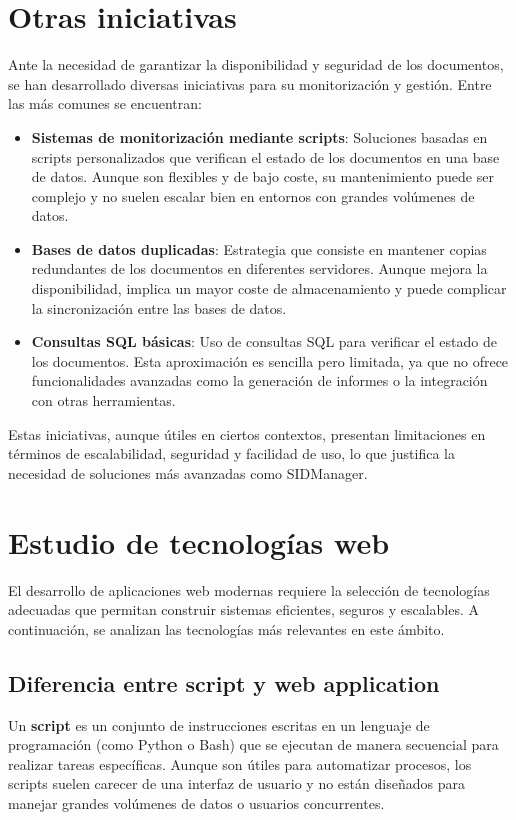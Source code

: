 \documentclass[draft]{scrbook}
\begin{document}
\section{Otras iniciativas}
Ante la necesidad de garantizar la disponibilidad y seguridad de los documentos, se han desarrollado diversas iniciativas para su monitorización y gestión. Entre las más comunes se encuentran:

\begin{itemize}
    \item \textbf{Sistemas de monitorización mediante scripts}:  Soluciones basadas en scripts personalizados que verifican el estado de los documentos en una base de datos. Aunque son flexibles y de bajo coste, su mantenimiento puede ser complejo y no suelen escalar bien en entornos con grandes volúmenes de datos.
    
    \item \textbf{Bases de datos duplicadas}:  Estrategia que consiste en mantener copias redundantes de los documentos en diferentes servidores. Aunque mejora la disponibilidad, implica un mayor coste de almacenamiento y puede complicar la sincronización entre las bases de datos.
    
    \item \textbf{Consultas SQL básicas}: Uso de consultas SQL para verificar el estado de los documentos. Esta aproximación es sencilla pero limitada, ya que no ofrece funcionalidades avanzadas como la generación de informes o la integración con otras herramientas.
\end{itemize}

Estas iniciativas, aunque útiles en ciertos contextos, presentan limitaciones en términos de escalabilidad, seguridad y facilidad de uso, lo que justifica la necesidad de soluciones más avanzadas como SIDManager.

\section{Estudio de tecnologías web}
El desarrollo de aplicaciones web modernas requiere la selección de tecnologías adecuadas que permitan construir sistemas eficientes, seguros y escalables. A continuación, se analizan las tecnologías más relevantes en este ámbito.

\subsection{Diferencia entre script y web application}
Un \textbf{script}  es un conjunto de instrucciones escritas en un lenguaje de programación (como Python o Bash) que se ejecutan de manera secuencial para realizar tareas específicas. Aunque son útiles para automatizar procesos, los scripts suelen carecer de una interfaz de usuario y no están diseñados para manejar grandes volúmenes de datos o usuarios concurrentes.
\end{document}
